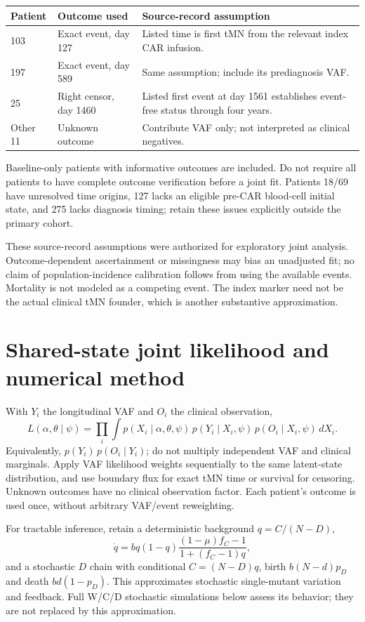 \documentclass[11pt]{article}
\begin{document}
\begin{center}\begin{tabular}{llp{}}\toprule
Patient & Outcome used & Source-record assumption\\\midrule
103 & Exact event, day 127 & Listed time is first tMN from the relevant index CAR infusion.\\
197 & Exact event, day 589 & Same assumption; include its prediagnosis VAF.\\
25 & Right censor, day 1460 & Listed first event at day 1561 establishes event-free status through four years.\\
Other 11 & Unknown outcome & Contribute VAF only; not interpreted as clinical negatives.\\\bottomrule
\end{tabular}\end{center}
Baseline-only patients with informative outcomes are included. Do not require all patients to have complete outcome verification before a joint fit. Patients 18/69 have unresolved time origins, 127 lacks an eligible pre-CAR blood-cell initial state, and 275 lacks diagnosis timing; retain these issues explicitly outside the primary cohort.

These source-record assumptions were authorized for exploratory joint analysis. Outcome-dependent ascertainment or missingness may bias an unadjusted fit; no claim of population-incidence calibration follows from using the available events. Mortality is not modeled as a competing event. The index marker need not be the actual clinical tMN founder, which is another substantive approximation.

\section{Shared-state joint likelihood and numerical method}
With $Y_i$ the longitudinal VAF and $O_i$ the clinical observation,
\[
L(\alpha,\theta\mid\psi)=\prod_i\int p(X_i\mid\alpha,\theta,\psi)
\,p(Y_i\mid X_i,\psi)\,p(O_i\mid X_i,\psi)\,dX_i.
\]
Equivalently, $p(Y_i)\,p(O_i\mid Y_i)$; do not multiply independent VAF and clinical marginals. Apply VAF likelihood weights sequentially to the same latent-state distribution, and use boundary flux for exact tMN time or survival for censoring. Unknown outcomes have no clinical observation factor. Each patient's outcome is used once, without arbitrary VAF/event reweighting.

For tractable inference, retain a deterministic background $q=C/(N-D)$,
\[
\dot q=bq(1-q)\frac{(1-\mu)f_C-1}{1+(f_C-1)q},
\]
and a stochastic $D$ chain with conditional $C=(N-D)q$, birth $b(N-d)p_D$ and death $bd(1-p_D)$. This approximates stochastic single-mutant variation and feedback. Full W/C/D stochastic simulations below assess its behavior; they are not replaced by this approximation.
\end{document}
